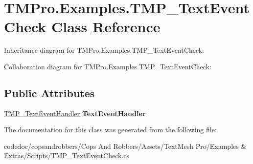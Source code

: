 \hypertarget{classTMPro_1_1Examples_1_1TMP__TextEventCheck}{}\section{T\+M\+Pro.\+Examples.\+T\+M\+P\+\_\+\+Text\+Event\+Check Class Reference}
\label{classTMPro_1_1Examples_1_1TMP__TextEventCheck}


Inheritance diagram for T\+M\+Pro.\+Examples.\+T\+M\+P\+\_\+\+Text\+Event\+Check\+:


Collaboration diagram for T\+M\+Pro.\+Examples.\+T\+M\+P\+\_\+\+Text\+Event\+Check\+:
\subsection*{Public Attributes}
\begin{DoxyCompactItemize}
\item 
\mbox{\label{classTMPro_1_1Examples_1_1TMP__TextEventCheck_ae23cb7bfed7c19448af70d9e7de12c95}} 
\hyperlink{classTMPro_1_1TMP__TextEventHandler}{T\+M\+P\+\_\+\+Text\+Event\+Handler} {\bfseries Text\+Event\+Handler}
\end{DoxyCompactItemize}


The documentation for this class was generated from the following file\+:\begin{DoxyCompactItemize}
\item 
codedoc/copsandrobbers/\+Cops And Robbers/\+Assets/\+Text\+Mesh Pro/\+Examples \& Extras/\+Scripts/T\+M\+P\+\_\+\+Text\+Event\+Check.\+cs\end{DoxyCompactItemize}

